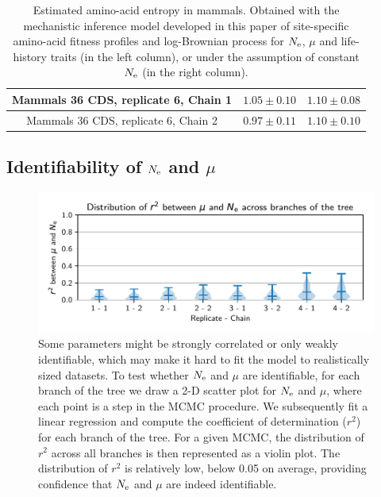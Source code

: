\documentclass{article}
\begin{document}
\begin{table}[H]
{\begin{tabu}{|c|c|c|}
			Mammals 36 {CDS}, replicate 6, Chain 1 & $1.05 \pm 0.10$ & $1.10 \pm 0.08$\\ \hline
			Mammals 36 {CDS}, replicate 6, Chain 2 & $0.97 \pm 0.11$ & $1.10 \pm 0.10$\\ \hline
		\end{tabu}}
		\caption[Entropy of amino acids in mammals]{Estimated amino-acid entropy in mammals.
		Obtained with the mechanistic inference model developed in this paper of site-specific amino-acid fitness profiles and log-Brownian process for $\Ne$, $\mu$ and life-history traits (in the left column), or under the assumption of constant $\Ne$ (in the right column).}
		\label{tab:table-entropy-aa-mutselne}
	\end{table}

	\subsection{Identifiability of $\Ne$ and $\mu$}
	\label{subsec:mammals-identifiability}

	\begin{figure}[H]
		\centering
		\includegraphics[width=\linewidth, page=1]{mammals/identifiability}
		\caption[Identibiblatexfiability of $\Ne$ and $\mu$]{
			Some parameters might be strongly correlated or only weakly identifiable, which may make it hard to fit the model to realistically sized datasets.
			To test whether $\Ne$ and $\mu$ are identifiable, for each branch of the tree we draw a 2-D scatter plot for $\Ne$ and $\mu$, where each point is a step in the MCMC procedure.
			We subsequently fit a linear regression and compute the coefficient of determination ($r^2$) for each branch of the tree.
			For a given MCMC, the distribution of $r^2$ across all branches is then represented as a violin plot.
			The distribution of $r^2$ is relatively low, below 0.05 on average, providing confidence that $\Ne$ and $\mu$ are indeed identifiable.}
	\end{figure}
\end{document}
